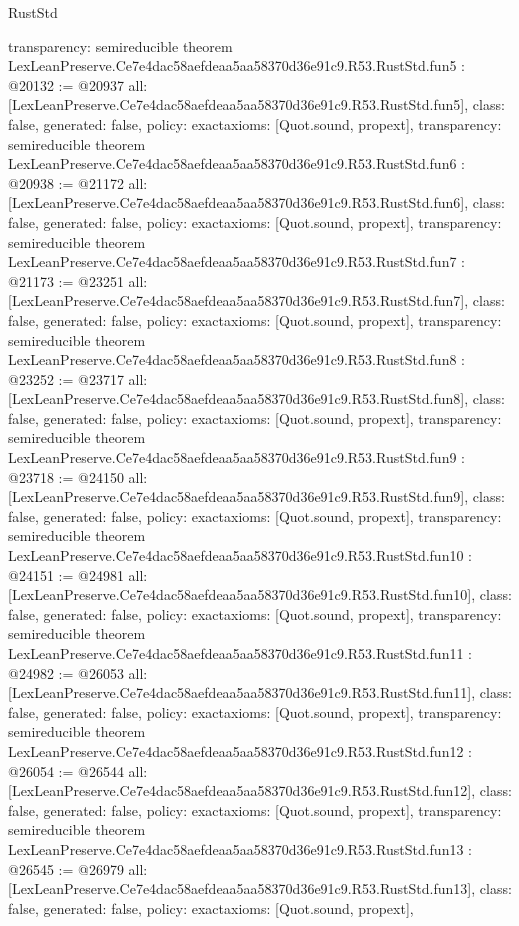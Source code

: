 \begin{lexlean}{RustStd}
\begin{coremodule}
{  transparency: semireducible
}
theorem LexLeanPreserve.Ce7e4dac58aefdeaa5aa58370d36e91c9.R53.RustStd.fun5 : @20132 := @20937 {
  all: [LexLeanPreserve.Ce7e4dac58aefdeaa5aa58370d36e91c9.R53.RustStd.fun5],
  class: false,
  generated: false,
  policy: exact{axioms: [Quot.sound, propext]},
  transparency: semireducible
}
theorem LexLeanPreserve.Ce7e4dac58aefdeaa5aa58370d36e91c9.R53.RustStd.fun6 : @20938 := @21172 {
  all: [LexLeanPreserve.Ce7e4dac58aefdeaa5aa58370d36e91c9.R53.RustStd.fun6],
  class: false,
  generated: false,
  policy: exact{axioms: [Quot.sound, propext]},
  transparency: semireducible
}
theorem LexLeanPreserve.Ce7e4dac58aefdeaa5aa58370d36e91c9.R53.RustStd.fun7 : @21173 := @23251 {
  all: [LexLeanPreserve.Ce7e4dac58aefdeaa5aa58370d36e91c9.R53.RustStd.fun7],
  class: false,
  generated: false,
  policy: exact{axioms: [Quot.sound, propext]},
  transparency: semireducible
}
theorem LexLeanPreserve.Ce7e4dac58aefdeaa5aa58370d36e91c9.R53.RustStd.fun8 : @23252 := @23717 {
  all: [LexLeanPreserve.Ce7e4dac58aefdeaa5aa58370d36e91c9.R53.RustStd.fun8],
  class: false,
  generated: false,
  policy: exact{axioms: [Quot.sound, propext]},
  transparency: semireducible
}
theorem LexLeanPreserve.Ce7e4dac58aefdeaa5aa58370d36e91c9.R53.RustStd.fun9 : @23718 := @24150 {
  all: [LexLeanPreserve.Ce7e4dac58aefdeaa5aa58370d36e91c9.R53.RustStd.fun9],
  class: false,
  generated: false,
  policy: exact{axioms: [Quot.sound, propext]},
  transparency: semireducible
}
theorem LexLeanPreserve.Ce7e4dac58aefdeaa5aa58370d36e91c9.R53.RustStd.fun10 : @24151 := @24981 {
  all: [LexLeanPreserve.Ce7e4dac58aefdeaa5aa58370d36e91c9.R53.RustStd.fun10],
  class: false,
  generated: false,
  policy: exact{axioms: [Quot.sound, propext]},
  transparency: semireducible
}
theorem LexLeanPreserve.Ce7e4dac58aefdeaa5aa58370d36e91c9.R53.RustStd.fun11 : @24982 := @26053 {
  all: [LexLeanPreserve.Ce7e4dac58aefdeaa5aa58370d36e91c9.R53.RustStd.fun11],
  class: false,
  generated: false,
  policy: exact{axioms: [Quot.sound, propext]},
  transparency: semireducible
}
theorem LexLeanPreserve.Ce7e4dac58aefdeaa5aa58370d36e91c9.R53.RustStd.fun12 : @26054 := @26544 {
  all: [LexLeanPreserve.Ce7e4dac58aefdeaa5aa58370d36e91c9.R53.RustStd.fun12],
  class: false,
  generated: false,
  policy: exact{axioms: [Quot.sound, propext]},
  transparency: semireducible
}
theorem LexLeanPreserve.Ce7e4dac58aefdeaa5aa58370d36e91c9.R53.RustStd.fun13 : @26545 := @26979 {
  all: [LexLeanPreserve.Ce7e4dac58aefdeaa5aa58370d36e91c9.R53.RustStd.fun13],
  class: false,
  generated: false,
  policy: exact{axioms: [Quot.sound, propext]},
}
\end{coremodule}
\end{lexlean}
